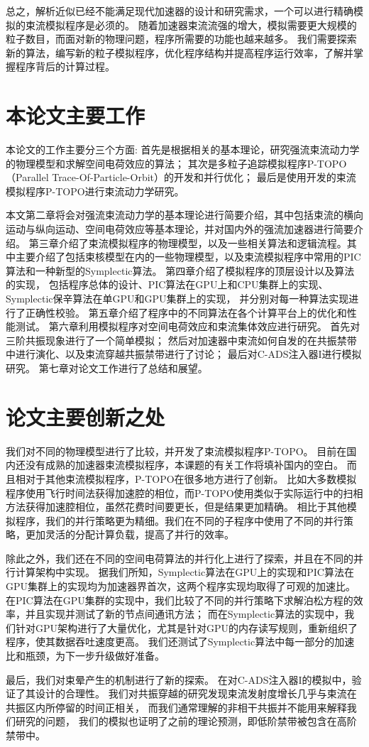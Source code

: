 总之，解析近似已经不能满足现代加速器的设计和研究需求，一个可以进行精确模拟的束流模拟程序是必须的。
随着加速器束流流强的增大，模拟需要更大规模的粒子数目，而面对新的物理问题，程序所需要的功能也越来越多。
我们需要探索新的算法，编写新的粒子模拟程序，优化程序结构并提高程序运行效率，了解并掌握程序背后的计算过程。

\section{本论文主要工作}  \label{section:Introduction_work}
本论文的工作主要分三个方面:
首先是根据相关的基本理论，研究强流束流动力学的物理模型和求解空间电荷效应的算法；
其次是多粒子追踪模拟程序P-TOPO（Parallel Trace-Of-Particle-Orbit）的开发和并行优化；
最后是使用开发的束流模拟程序P-TOPO进行束流动力学研究。

本文第二章将会对强流束流动力学的基本理论进行简要介绍，其中包括束流的横向运动与纵向运动、空间电荷效应等基本理论，并对国内外的强流加速器进行简要介绍。
第三章介绍了束流模拟程序的物理模型，以及一些相关算法和逻辑流程。其中主要介绍了包括束核模型在内的一些物理模型，以及束流模拟程序中常用的PIC算法和一种新型的Symplectic算法。
第四章介绍了模拟程序的顶层设计以及算法的实现，
包括程序总体的设计、PIC算法在GPU上和CPU集群上的实现、Symplectic保辛算法在单GPU和GPU集群上的实现，
并分别对每一种算法实现进行了正确性校验。
第五章介绍了程序中的不同算法在各个计算平台上的优化和性能测试。
第六章利用模拟程序对空间电荷效应和束流集体效应进行研究。
首先对三阶共振现象进行了一个简单模拟；
然后对加速器中束流如何自发的在共振禁带中进行演化、以及束流穿越共振禁带进行了讨论；
最后对C-ADS注入器I进行模拟研究。
第七章对论文工作进行了总结和展望。

\section{论文主要创新之处} \label{section:Introduction_new}
我们对不同的物理模型进行了比较，并开发了束流模拟程序P-TOPO。
目前在国内还没有成熟的加速器束流模拟程序，本课题的有关工作将填补国内的空白。
而且相对于其他束流模拟程序，P-TOPO在很多地方进行了创新。
比如大多数模拟程序使用飞行时间法获得加速腔的相位，而P-TOPO使用类似于实际运行中的扫相方法获得加速腔相位，虽然花费时间要更长，但是结果更加精确。
相比于其他模拟程序，我们的并行策略更为精细。我们在不同的子程序中使用了不同的并行策略，更加灵活的分配计算负载，提高了并行的效率。

除此之外，我们还在不同的空间电荷算法的并行化上进行了探索，并且在不同的并行计算架构中实现。
据我们所知，Symplectic算法在GPU上的实现和PIC算法在GPU集群上的实现均为加速器界首次，这两个程序实现均取得了可观的加速比。
在PIC算法在GPU集群的实现中，我们比较了不同的并行策略下求解泊松方程的效率，并且实现并测试了新的节点间通讯方法；
而在Symplectic算法的实现中，我们针对GPU架构进行了大量优化，尤其是针对GPU的内存读写规则，重新组织了程序，使其数据吞吐速度更高。
我们还测试了Symplectic算法中每一部分的加速比和瓶颈，为下一步升级做好准备。

最后，我们对束晕产生的机制进行了新的探索。
在对C-ADS注入器I的模拟中，验证了其设计的合理性。
我们对共振穿越的研究发现束流发射度增长几乎与束流在共振区内所停留的时间正相关，
而我们通常理解的非相干共振并不能用来解释我们研究的问题，
我们的模拟也证明了之前的理论预测，即低阶禁带被包含在高阶禁带中。
